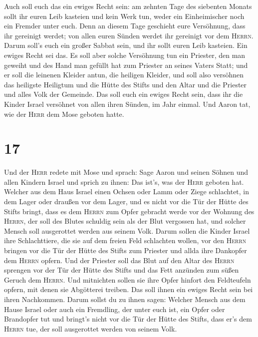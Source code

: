  Auch soll euch das ein ewiges Recht sein: am zehnten
Tage des siebenten Monats sollt ihr euren Leib kasteien und kein Werk
tun, weder ein Einheimischer noch ein Fremder unter euch.
 Denn an diesem Tage geschieht eure Versöhnung, dass ihr
gereinigt werdet; von allen euren Sünden werdet ihr gereinigt vor dem
\textsc{Herrn}.  Darum soll's euch ein großer Sabbat
sein, und ihr sollt euren Leib kasteien. Ein ewiges Recht sei das.
 Es soll aber solche Versöhnung tun ein Priester, den man
geweiht und des Hand man gefüllt hat zum Priester an seines Vaters
Statt; und er soll die leinenen Kleider antun, die heiligen Kleider,
 und soll also versöhnen das heiligste Heiligtum und die
Hütte des Stifts und den Altar und die Priester und alles Volk der
Gemeinde.  Das soll euch ein ewiges Recht sein, dass ihr
die Kinder Israel versöhnet von allen ihren Sünden, im Jahr einmal. Und
Aaron tat, wie der \textsc{Herr} dem Mose geboten hatte.

\hypertarget{section-16}{%
\section{17}\label{section-16}}

 Und der \textsc{Herr} redete mit Mose und sprach:
 Sage Aaron und seinen Söhnen und allen Kindern Israel und
sprich zu ihnen: Das ist's, was der \textsc{Herr} geboten hat.
 Welcher aus dem Haus Israel einen Ochsen oder Lamm oder
Ziege schlachtet, in dem Lager oder draußen vor dem Lager,
 und es nicht vor die Tür der Hütte des Stifts bringt,
dass es dem \textsc{Herrn} zum Opfer gebracht werde vor der Wohnung des
\textsc{Herrn}, der soll des Blutes schuldig sein als der Blut vergossen
hat, und solcher Mensch soll ausgerottet werden aus seinem Volk.
 Darum sollen die Kinder Israel ihre Schlachttiere, die
sie auf dem freien Feld schlachten wollen, vor den \textsc{Herrn}
bringen vor die Tür der Hütte des Stifts zum Priester und allda ihre
Dankopfer dem \textsc{Herrn} opfern.  Und der Priester
soll das Blut auf den Altar des \textsc{Herrn} sprengen vor der Tür der
Hütte des Stifts und das Fett anzünden zum süßen Geruch dem
\textsc{Herrn}.  Und mitnichten sollen sie ihre Opfer
hinfort den Feldteufeln opfern, mit denen sie Abgötterei treiben. Das
soll ihnen ein ewiges Recht sein bei ihren Nachkommen. 
Darum sollst du zu ihnen sagen: Welcher Mensch aus dem Hause Israel oder
auch ein Fremdling, der unter euch ist, ein Opfer oder Brandopfer tut
 und bringt's nicht vor die Tür der Hütte des Stifts, dass
er's dem \textsc{Herrn} tue, der soll ausgerottet werden von seinem
Volk.


